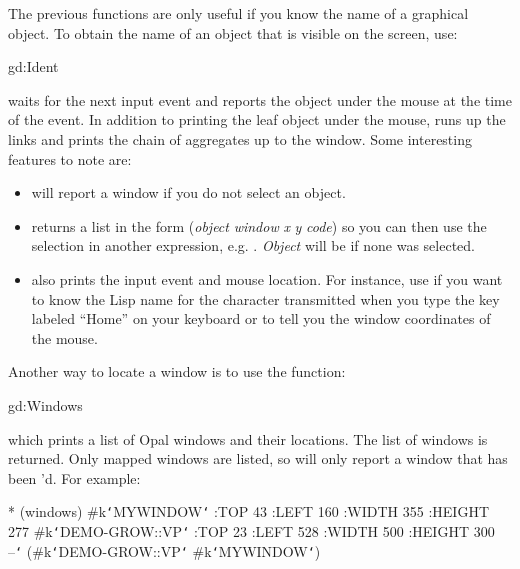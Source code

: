 The previous functions are only useful if you know the name
of a graphical object.  To obtain the name of an object that
is visible on the screen, use:
\begin{programexample}
gd:Ident\value{function}
\end{programexample}
 waits for the next input event and reports the object
under the mouse at the time of the event.
In addition to printing the leaf 
object under the mouse,
 runs up the  links and prints the chain
of aggregates up to the window.
Some interesting features to note are:
\begin{itemize}
\item {} will report a window if you do not select an object.

\item {} returns a list in the form ({\it object} {\it window} {\it x} {\it y} {\it code})
so you can then use the selection in another expression, e.g.
.  {\it Object} will be  if none was
selected.

\item {} also prints the input event and mouse location.  For
instance, use 
if you want to know the Lisp name 
for the character
transmitted when you type the key labeled ``Home'' on your keyboard
or to tell you the window coordinates 
of the mouse.
\end{itemize}

Another way to locate  a window is to use the function:
\begin{programexample}
gd:Windows\value{function}
\end{programexample}
which prints a list of Opal windows and their locations.  The
list of windows is returned.  Only mapped windows are listed,
so  will only report a window that has been
'd.    For example:
\begin{programexample}
* (windows)
\#k{\tt\char`\<}MYWINDOW{\tt\char`\>} :TOP 43 :LEFT 160 :WIDTH 355 :HEIGHT 277
\#k{\tt\char`\<}DEMO-GROW::VP{\tt\char`\>} :TOP 23 :LEFT 528 :WIDTH 500 :HEIGHT 300
--{\tt\char`\>} (\#k{\tt\char`\<}DEMO-GROW::VP{\tt\char`\>} \#k{\tt\char`\<}MYWINDOW{\tt\char`\>})
\end{programexample}

